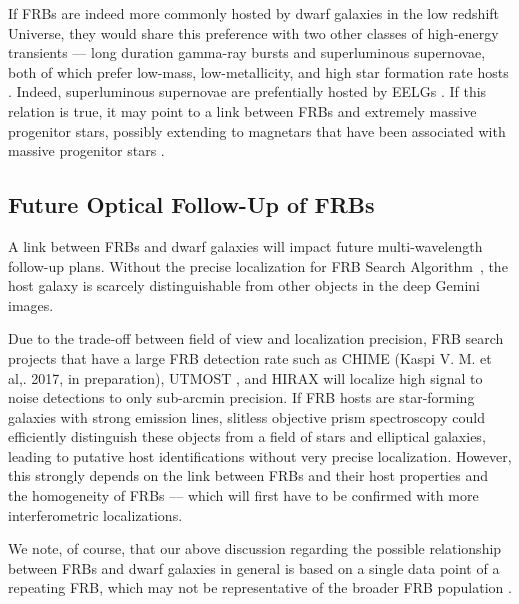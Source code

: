 \documentclass[twocolumn]{aastex61}
\def \frb {FRB Search Algorithm}
\begin{document}
If FRBs are indeed more commonly hosted by dwarf galaxies in the low redshift Universe, they would share this preference with two other classes of high-energy transients --- long duration gamma-ray bursts and superluminous supernovae, both of which prefer low-mass, low-metallicity, and high star formation rate hosts \citep[e.g., ][ and other works]{fls+06,plt+13,vsj+15,pqy+16}. Indeed, superluminous supernovae are prefentially hosted by EELGs \citep{lsk+15}. If this relation is true, it may point to a link between FRBs and extremely massive progenitor stars, possibly extending to magnetars that have been associated with massive progenitor stars \citep[e.g.  ][]{ok14}.



\subsection{Future Optical Follow-Up of FRBs}
A link between FRBs and dwarf galaxies will impact future multi-wavelength follow-up plans. Without the precise localization for \frb\ \citep{clw+16}, the host galaxy is scarcely distinguishable from other objects in the deep Gemini images. 

 Due to the trade-off between field of view and localization precision, FRB search projects that have a large FRB detection rate such as CHIME (Kaspi V. M. et al,. 2017, in preparation), UTMOST \citep{cfb+16}, and HIRAX \citep{nbb+16} will localize high signal to noise detections to only sub-arcmin precision. If FRB hosts are star-forming galaxies with strong emission lines, slitless objective prism spectroscopy could efficiently distinguish these objects from a field of stars and elliptical galaxies, leading to putative host identifications without very precise localization. However, this strongly depends on the link between FRBs and their host properties and the homogeneity of FRBs --- which will first have to be confirmed with more interferometric localizations.


We note, of course, that our above discussion regarding the possible relationship between FRBs and dwarf galaxies in general is based on a single data point of a repeating FRB, which may not be representative of the broader FRB population \citep[see][for more details]{ssh+16a,ssh+16b}. 
\end{document}
